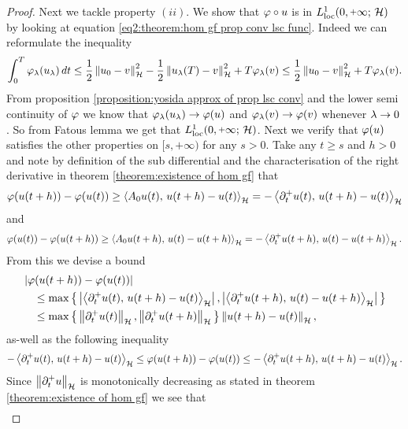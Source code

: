 \begin{proof}
	Next we tackle property $ (ii) $. We show that $ \varphi\circ u $ is in
	$ L_{\mathrm{loc}}^1(0,\plus\infty;\,\rH) $ by looking
	at equation \eqref{eq2:theorem:hom gf prop conv lsc func}.
	Indeed we can reformulate the inequality
	\begin{align*}
		\int_0^T \varphi_\lambda(u_\lambda)\,dt
		\leq \frac{1}{2}\left\Vert u_0-v\right\Vert_{\mathcal{H}}^2
		-\frac{1}{2}\left\Vert u_\lambda(T)-v\right\Vert_{\mathcal{H}}^2+T\varphi_\lambda(v)
		\leq \frac{1}{2}\left\Vert u_0-v\right\Vert_{\mathcal{H}}^2+T\varphi_\lambda(v).
	\end{align*}
	From proposition \ref{proposition:yosida approx of prop lsc conv}
	and the lower semi continuity of $ \varphi $
	we know that $ \varphi_\lambda(u_\lambda)\rightarrow \varphi(u) $
	and $ \varphi_\lambda(v)\rightarrow\varphi(v) $ whenever $ \lambda\rightarrow 0 $.
	So from Fatous lemma we get that
	$ L_{\mathrm{loc}}^1(0,\plus\infty;\,\rH) $.
	Next we verify that $ \varphi(u) $ satisfies the
	other properties on $ [s,\plus\infty) $ for
	any $ s>0 $. Take any $ t\geq s $ and $ h>0 $
	and note by definition of the sub differential
	and the characterisation of the right derivative
	in theorem \ref{theorem:existence of hom gf} that
	\begin{align*}
		\varphi(u(t+h))-\varphi(u(t))
		\geq\left\langle A_0 u(t),\,u(t+h)-u(t)\right\rangle_{\mathcal{H}}
		=-\left\langle \partial_t^+ u(t),\,u(t+h)-u(t)\right\rangle_{\mathcal{H}}
	\end{align*}
	and
	\begin{align*}
		\varphi(u(t))-\varphi(u(t+h))
		\geq\left\langle A_0 u(t+h),\,u(t)-u(t+h)\right\rangle_{\mathcal{H}}
		=-\left\langle \partial_t^+ u(t+h),\,u(t)-u(t+h)\right\rangle_{\mathcal{H}}.
	\end{align*}
	From this we devise a bound
	\begin{align}\label{eq5:proposition:hom gf prop conv lsc func}
		\begin{split}
			&\left\vert \varphi(u(t+h))-\varphi(u(t))\right\vert\\
			&\quad\leq \max\big\{\left\vert \left\langle \partial_t^+ u(t),\,u(t+h)-u(t)\right\rangle_{\mathcal{H}}\right\vert,
			\left\vert \left\langle \partial_t^+ u(t+h),\,u(t)-u(t+h)\right\rangle_{\mathcal{H}}\right\vert\big\}\\
			&\quad\leq \max\big\{\left\Vert \partial_t^+ u(t)\right\Vert_{\mathcal{H}},
			\left\Vert \partial_t^+ u(t+h)\right\Vert_{\mathcal{H}}\big\}\left\Vert u(t+h)-u(t)\right\Vert_{\mathcal{H}},
		\end{split}
	\end{align}
	as-well as the following inequality
	\begin{align}\label{eq6:proposition:hom gf prop conv lsc func}
		-\left\langle \partial_t^+ u(t),\,u(t+h)-u(t)\right\rangle_{\mathcal{H}}
		\leq \varphi(u(t+h))-\varphi(u(t))
		\leq-\left\langle \partial_t^+ u(t+h),\,u(t+h)-u(t)\right\rangle_{\mathcal{H}}.
	\end{align}
	Since $ \left\Vert \partial_t^+ u\right\Vert_{\mathcal{H}} $ is monotonically decreasing as stated
	in theorem \ref{theorem:existence of hom gf} we see that
	\begin{align*}

\end{align*}
\end{proof}
